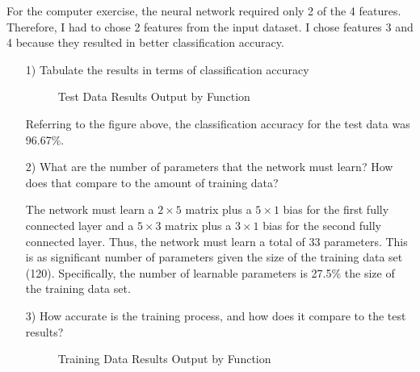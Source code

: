 \documentclass[fleqn]{article}
\begin{document}
\begin{enumerate}
		For the computer exercise, the neural network required only 2 of the 4 features. Therefore, I had to chose 2 features from the input dataset. I chose features 3 and 4 because they resulted in better classification accuracy.
		
		\begin{enumerate}
			\item[1)] Tabulate the results in terms of classification accuracy
			
			\begin{figure}[H]
				\centerline{}
				\caption{Test Data Results Output by Function}
				\label{test_data_results}
			\end{figure}
		
			Referring to the figure above, the classification accuracy for the test data was 96.67\%.
			
			\item[2)] What are the number of parameters that the network must learn? How does that compare to the amount of training data?
			
			The network must learn a $2 \times 5$ matrix plus a $5 \times 1$ bias for the first fully connected layer and a $5 \times 3$ matrix plus a $3 \times 1$ bias for the second fully connected layer. Thus, the network must learn a total of 33 parameters. This is as significant number of parameters given the size of the training data set (120). Specifically, the number of learnable parameters is 27.5\% the size of the training data set. 
			
			\item[3)] How accurate is the training process, and how does it compare to the test results?
			
			\begin{figure}[H]
				\centerline{}
				\caption{Training Data Results Output by Function}
				\label{training_data_results}
			\end{figure}
		

\end{enumerate}
\end{enumerate}
\end{document}
